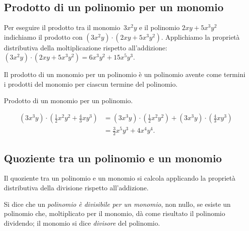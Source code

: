 
\subsection{Prodotto di un polinomio per un monomio}
\label{subsec:10_poli_prodottopermonomio}

Per eseguire il prodotto tra il monomio~\(3x^{2}y\) e il polinomio
\(2{xy}+5x^{3}y^{2}\) indichiamo il prodotto con
\(\left(3x^{2}y\right)\cdot \left(2{xy}+5x^{3}y^{2}\right)\).
Applichiamo la proprietà distributiva della moltiplicazione rispetto
all'addizione:~\(\left(3x^{2}y\right)\cdot
\left(2{xy}+5x^{3}y^{2}\right)=6x^{3}y^{2}+15x^{5}y^{3}\).

\osservazione Il prodotto di un monomio per un polinomio è
un polinomio avente come termini i prodotti del monomio per ciascun
termine del polinomio.

\begin{exrig}
 \begin{esempio}
 Prodotto di un monomio per un polinomio.

 \begin{equation*}
\begin{split}
\left(3x^{3}y\right)\cdot\left(\frac{1}{2}x^{2}y^{2}+\frac{4}{3}{xy}^{3}
\right)&=\left(3x^{3}y\right)\cdot\left(\frac{1}{2}x^{2}y^{2}
\right)+\left(3x^{3}y\right)\cdot%
\left(\frac{4}{3}{xy}^{3}\right)\\
&=\frac{3}{2}x^{5}y^{3}+4x^{4}y^{4}.
\end{split}
\end{equation*}
 \end{esempio}
\end{exrig}


\subsection{Quoziente tra un polinomio e un monomio}
\label{subsec:10_poli_quozientepermonomio}

Il quoziente tra un polinomio e un monomio si calcola applicando la
proprietà distributiva della divisione rispetto
all'addizione.

\begin{definizione}
 Si dice che un \emph{polinomio è divisibile per un monomio}, non
nullo, se esiste un polinomio che, moltiplicato per il monomio, dà
come risultato il polinomio dividendo; il monomio si dice
\emph{divisore} del polinomio.
\end{definizione}

